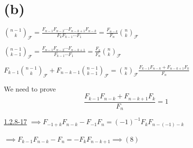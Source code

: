 \documentclass{article}
\begin{document}
\section*{(b)}

\( \binom{n-1}{k}_{\mathcal{F}} = \frac{F_{n-1}F_{n-2} \cdots F_{n-k+1}F_{n-k}}{F_{k} F_{k-1} \cdots F_{1}} = \frac{F_{n-k}}{F_{n}} \binom{n}{k}_{\mathcal{F}} \)

\( \binom{n-1}{k-1}_{\mathcal{F}} = \frac{F_{n-1}F_{n-2} \cdots F_{n-k+1}}{F_{k-1} \cdots F_{1}} = \frac{F_{k}}{F_{n}} \binom{n}{k}_{\mathcal{F}} \)

\( F_{k-1}\binom{n-1}{k}_{\mathcal{F}} + F_{n-k-1} \binom{n-1}{k-1}_{\mathcal{F}} = \binom{n}{k}_{\mathcal{F}} \frac{F_{k-1}F_{n-k} + F_{n-k+1}F_{k}}{F_{n}} \)

We need to prove
\[\frac{F_{k-1}F_{n-k} + F_{n-k+1}F_{k}}{F_{n}} = 1 \tag{*}\label{eq:star}\]

\href{./1.2.8-17.pdf}{1.2.8\mbox{-}17} \( \implies F_{-1+k}F_{n-k} - F_{-1}F_{n} = {(-1)}^{-1}F_{k}F_{n-(-1)-k} \)

\( \implies F_{k-1}F_{n-k} - F_{n} = -F_{k}F_{n-k+1} \implies (8) \)
\end{document}
